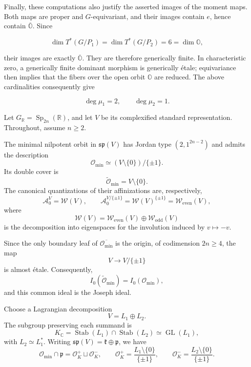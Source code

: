 Finally, these computations also justify the asserted images of the moment maps. Both maps are proper and \(G\)-equivariant, and their images contain \(e\), hence contain \(\overline{\mathbb O}\). Since

\[
\dim T^*(G/P_1)=\dim T^*(G/P_2)=6=\dim\mathbb O,
\]

their images are exactly \(\overline{\mathbb O}\). They are therefore generically finite. In characteristic zero, a generically finite dominant morphism is generically étale; equivariance then implies that the fibers over the open orbit \(\mathbb O\) are reduced. The above cardinalities consequently give

\[
\deg\mu_1=2,\qquad\deg\mu_2=1.
\]

\label{sec:oscillator-quantization}

Let $G_{\mathbb R}=\operatorname{Sp}_{2n}(\mathbb R)$, and let $V$ be its
complexified standard representation. Throughout, assume $n\geq 2$.

The minimal nilpotent orbit in $\mathfrak{sp}(V)$ has Jordan type
$(2,1^{2n-2})$ and admits the description
\[
  \mathcal O_{\min}\simeq (V\setminus\{0\})/\{\pm1\}.
\]
Its double cover is
\[
  \widetilde{\mathcal O}_{\min}=V\setminus\{0\}.
\]
The canonical quantizations of their affinizations are, respectively,
\[
  \mathcal A_0^V=\mathcal W(V),
  \qquad
  \mathcal A_0^{V/\{\pm1\}}
  =\mathcal W(V)^{\{\pm1\}}
  =\mathcal W_{\mathrm{even}}(V),
\]
where
\[
  \mathcal W(V)
  =\mathcal W_{\mathrm{even}}(V)
  \oplus\mathcal W_{\mathrm{odd}}(V)
\]
is the decomposition into eigenspaces for the involution induced by
$v\mapsto -v$.

Since the only boundary leaf of $\overline{\mathcal O_{\min}}$ is the
origin, of codimension $2n\geq 4$, the map
\[
  V\longrightarrow V/\{\pm1\}
\]
is almost étale. Consequently,
\[
  I_0(\widetilde{\mathcal O}_{\min})
  =I_0(\mathcal O_{\min}),
\]
and this common ideal is the Joseph ideal.

Choose a Lagrangian decomposition
\[
  V=L_1\oplus L_2.
\]
The subgroup preserving each summand is
\[
  K_{\mathbb C}
  =\operatorname{Stab}(L_1)\cap\operatorname{Stab}(L_2)
  \simeq\operatorname{GL}(L_1),
\]
with $L_2\simeq L_1^*$. Writing
$\mathfrak{sp}(V)=\mathfrak k\oplus\mathfrak p$, we have
\[
  \mathcal O_{\min}\cap\mathfrak p
  =\mathcal O_K^+\sqcup\mathcal O_K^-,
  \qquad
  \mathcal O_K^+
  =\frac{L_1\setminus\{0\}}{\{\pm1\}},
  \qquad
  \mathcal O_K^-
  =\frac{L_2\setminus\{0\}}{\{\pm1\}}.
\]

